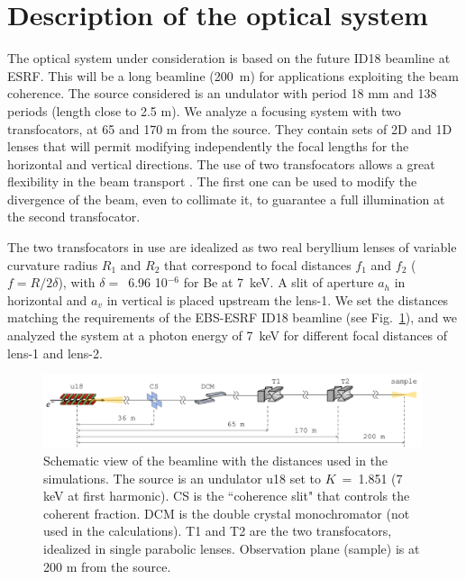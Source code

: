 \documentclass{iucr}              %
\begin{document}
\section{Description of the optical system}
\label{sec:beamline}

The optical system under consideration is based on the future ID18 beamline at ESRF. This will be a long beamline (200~m) for applications exploiting the beam coherence. The source considered is an undulator with period 18 mm and 138 periods (length close to 2.5 m).  
We analyze a focusing system with two transfocators, at 65 and 170 m from the source. They contain sets of 2D and 1D lenses that will permit modifying independently the focal lengths for the horizontal and vertical directions. The use of two transfocators allows a great flexibility in the beam transport \cite{Vaughan:kv5084}. The first one can be used to modify the divergence of the beam, even to collimate it, to guarantee a full illumination at the second transfocator.  

The two transfocators in use are idealized as two real beryllium lenses of variable curvature radius $R_1$ and $R_2$ that correspond to focal distances $f_1$ and $f_2$ ($f=R/2\delta$), with $\delta=$~6.96 10$^{-6}$ for Be at \SI{7}{keV}. A slit of aperture $a_h$ in horizontal and $a_v$ in vertical is placed upstream the lens-1. We set the distances matching the requirements of the EBS-ESRF ID18 beamline (see Fig.~\ref{fig:beamline}), and we analyzed the system at a photon energy of \SI{7}{keV} for different focal distances of lens-1 and lens-2. 
\onecolumn
\begin{figure}\label{fig:beamline}
    \includegraphics[width=0.99\textwidth]{figures/beamline.pdf}
    \caption{Schematic view of the beamline with the distances used in the simulations. The source is an undulator u18 set to $K$~=~1.851 (7 keV at first harmonic). CS is the ``coherence slit" that controls the coherent fraction. DCM is the double crystal monochromator (not used in the calculations). T1 and T2 are the two transfocators, idealized in single parabolic lenses. Observation plane (sample) is at 200 m from the source. 
    }
\end{figure}
\twocolumn
\end{document}
